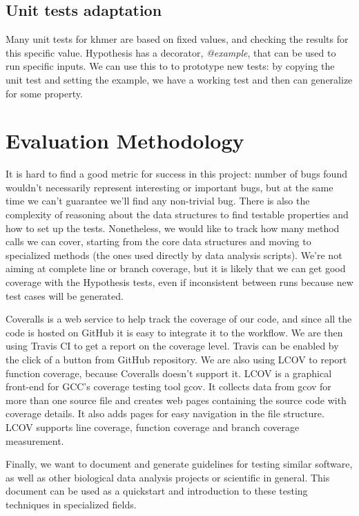 \documentclass[preprint,nocopyrightspace]{sig-alternate}
\begin{document}
\subsection{Unit tests adaptation}
Many unit tests for khmer are based on fixed values,
and checking the results for this specific value.
Hypothesis has a decorator,
\emph{@example},
that can be used to run specific inputs.
We can use this to to prototype new tests:
by copying the unit test and setting the example,
we have a working test and then can generalize for some property.

\section{Evaluation Methodology}
It is hard to find a good metric for success in this project:
number of bugs found wouldn't necessarily represent interesting or important bugs,
but at the same time we can't guarantee we'll find any non-trivial bug.
There is also the complexity of reasoning about the data structures to find testable properties and how to set up the tests.
Nonetheless,
we would like to track how many method calls we can cover,
starting from the core data structures and moving to specialized methods (the ones used directly by data analysis scripts).
We're not aiming at complete line or branch coverage,
but it is likely that we can get good coverage with the Hypothesis tests,
even if inconsistent between runs because new test cases will be generated.

Coveralls is a web service to help track the coverage of our code,
and since all the code is hosted on GitHub it is easy to integrate it to the workflow.
We are then using Travis CI to get a report on the coverage level.
Travis can be enabled by the click of a button from GitHub repository.
We are also using LCOV to report function coverage,
because Coveralls doesn't support it.
LCOV is a graphical front-end for GCC's coverage testing tool gcov.
It collects data from gcov for more than one source file and creates web pages containing the
source code with coverage details.
It also adds pages for easy navigation in the file structure.
LCOV supports line coverage, function coverage and branch coverage measurement.

Finally,
we want to document and generate guidelines for testing similar software,
as well as other biological data analysis projects or scientific in general.
This document can be used as a quickstart and introduction to these testing techniques in specialized fields.
\end{document}

